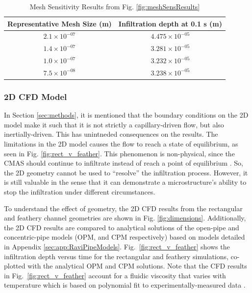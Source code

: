 \documentclass{UCF_ETD}
\begin{document}
\begin{table}[htp!]
    \centering
    \caption{Mesh Sensitivity Results from Fig. \ref{fig:meshSensResults}}
    \begin{tabular}{c|c}
       Representative Mesh Size (m)  & Infiltration depth at 0.1 s (m) \\
       \hline
        $2.1\times10^{-07}$ & $4.475\times10^{-05}$ \\
        $1.4\times10^{-07}$ & $3.281\times10^{-05}$ \\
        $1.0\times10^{-07}$ & $3.232\times10^{-05}$ \\
        $7.5\times10^{-08}$ & $3.238\times10^{-05}$
    \end{tabular}
    \label{tab:meshSensResults}
\end{table}

\subsubsection{2D CFD Model}
In Section \ref{sec:methods}, it is mentioned that the boundary conditions on the 2D model make it such that it is not strictly a capillary-driven flow, but also inertially-driven. This has unintneded consequences on the results. The limitations in the 2D model causes the flow to reach a state of equilibrium, as seen in Fig. \ref{fig:rect_v_feather}. This phenomenon is non-physical, since the CMAS should continue to infiltrate instead of reach a point of equilibrium \cite{Naraparaju2017}. So, the 2D geometry cannot be used to ``resolve'' the infiltration process. However, it is still valuable in the sense that it can demonstrate a microstructure's ability to stop the infiltration under different circumstances.

To understand the effect of geometry, the 2D CFD results from the rectangular and feathery channel geometries are shown in Fig. \ref{fig:dimensions}.
Additionally, the 2D CFD results are compared to analytical solutions of the open-pipe and concentric-pipe models (OPM, and CPM respectively) \cite{Naraparaju2019} based on models detailed in Appendix \ref{sec:app:RaviPipeModels}. 
Fig.~\ref{fig:rect_v_feather} shows the infiltration depth versus time for the rectangular and feathery simulations, co-plotted with the analytical OPM and CPM solutions. 
Note that the CFD results in Fig.~\ref{fig:rect_v_feather} account for a fluidic viscosity that varies with temperature which is based on polynomial fit to experimentally-measured data \cite{Naraparaju2017}.\\
\end{document}

